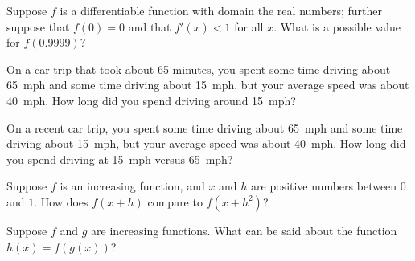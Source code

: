 \documentclass{ximera}
\begin{document}
\begin{problem}
  Suppose $f$ is a differentiable function with domain the real numbers; further suppose that $f(0) = 0$ and that $f'(x) < 1$ for all $x$.  What is a possible value for $f(0.9999)$?
  \begin{multipleChoice}
  \end{multipleChoice}
\end{problem}

\begin{problem}
  On a car trip that took about 65 minutes, you spent some time
  driving about 65~mph and some time driving about 15~mph, but your
  average speed was about 40~mph.  How long did you spend driving
  around 15~mph?
  \begin{multipleChoice}
  \end{multipleChoice}
\end{problem}

\begin{problem}
  On a recent car trip, you spent some time driving about 65~mph and
  some time driving about 15~mph, but your average speed was about
  40~mph.  How long did you spend driving at 15~mph versus 65~mph?
  \begin{multipleChoice}
  \end{multipleChoice}
\end{problem}

\begin{problem}
  Suppose $f$ is an increasing function, and $x$ and $h$ are positive numbers between $0$ and $1$.  How does $f(x + h)$ compare to $f(x + h^2)$?
  \begin{multipleChoice}
  \end{multipleChoice}
\end{problem}

\begin{problem}
  Suppose $f$ and $g$ are increasing functions.  What can be said about the function $h(x) = f(g(x))$?
  \begin{multipleChoice}
  \end{multipleChoice}
\end{problem}
\end{document}
